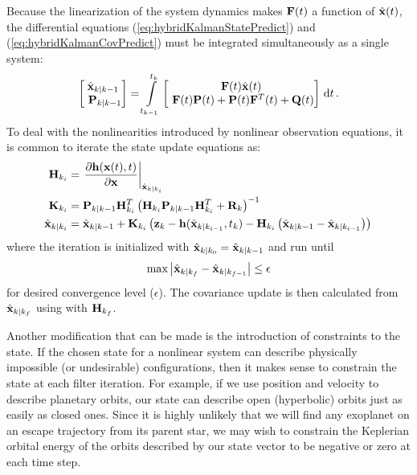 Because the linearization of the system dynamics makes $\mathbf F(t)$ a function of $\hat{\mathbf x}(t)$, the differential equations  (\ref{eq:hybridKalmanStatePredict}) and (\ref{eq:hybridKalmanCovPredict}) must be integrated simultaneously as a single system:
\begin{equation}\label{eq:stateCovIntegration}
\begin{bmatrix} \hat{\mathbf x}_{k|k-1} \\\ \mathbf P_{k|k-1} \end{bmatrix} = 
\int\limits_{t_{k-1}}^{t_k} \begin{bmatrix}  \mathbf F(t)\hat{\mathbf x}(t) \\\   \mathbf F(t)\mathbf P(t) + \mathbf P(t) \mathbf F^T(t) + \mathbf Q(t) \end{bmatrix} \,\mathrm{d}t \,.
\end{equation}
To deal with the nonlinearities introduced by nonlinear observation equations, it is common to iterate the state update equations as:
\begin{align}
\mathbf H_{k_i} &= \left.\frac{\partial \mathbf h(\mathbf x(t),t)}{\partial \mathbf x} \right|_{\hat{\mathbf x}_{k|{k_i}}} \\
\mathbf K_{k_i} &= \mathbf P_{k|k-1} \mathbf H_{k_i}^T \left(\mathbf H_{k_i} \mathbf P_{k|k-1} \mathbf H_{k_i}^T + \mathbf R_k\right)^{-1}  \\
\hat{\mathbf x}_{k|{k_i}} &= \hat{\mathbf x}_{k|k-1} + \mathbf K_{k_i} \left( \mathbf z_k - \mathbf h(\hat{\mathbf x}_{k|{k_{i-1}}},t_k)
- \mathbf H_{k_i}\left( \hat{\mathbf x}_{k|k-1} -  \hat{\mathbf x}_{k|{k_{i-1}}} \right)\right) \,
\end{align}
where the iteration is initialized with $\hat{\mathbf x}_{k|{k_0}} = \hat{\mathbf x}_{k|k-1}$ and run until
\begin{equation}
\max \left\vert \hat{\mathbf x}_{k|{k_{f}}}  - \hat{\mathbf x}_{k|{k_{f-1}}} \right\vert \le \epsilon 
\end{equation}
for desired convergence level ($\epsilon$).  The covariance update is then calculated from $\hat{\mathbf x}_{k|{k_{f}}}$ using  with $\mathbf H_{k_f}$.  

Another modification that can be made is the introduction of constraints to the state.  If the chosen state for a nonlinear system can describe physically impossible (or undesirable) configurations, then it makes sense to constrain the state at each filter iteration.  For example, if we use position and velocity to describe planetary orbits, our state can describe open (hyperbolic) orbits just as easily as closed ones.  Since it is highly unlikely that we will find any exoplanet on an escape trajectory from its parent star, we may wish to constrain the Keplerian orbital energy of the orbits described by our state vector to be negative or zero at each time step.  

